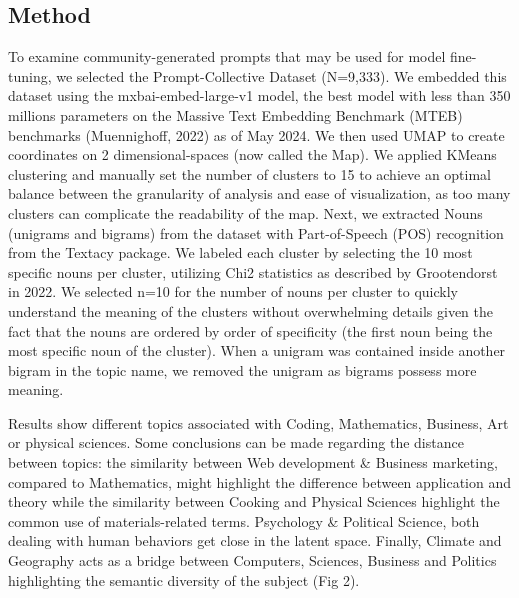 \documentclass{article}
\begin{document}
\subsection{Method}

To examine community-generated prompts that may be used for model fine-tuning, we selected the Prompt-Collective Dataset (N=9,333).  We embedded this dataset using the mxbai-embed-large-v1 model, the best model with less than 350 millions parameters on the  Massive Text Embedding Benchmark (MTEB) benchmarks (Muennighoff, 2022) as of May 2024. We then used UMAP to create coordinates on 2 dimensional-spaces (now called the Map). We applied KMeans clustering and manually set the number of clusters to 15 to achieve an optimal balance between the granularity of analysis and ease of visualization, as too many clusters can complicate the readability of the map. Next, we extracted Nouns (unigrams and bigrams) from the dataset with Part-of-Speech (POS) recognition from the Textacy package. We labeled each cluster by selecting the 10 most specific nouns per cluster, utilizing Chi2 statistics as described by Grootendorst in 2022. We selected n=10 for the number of nouns per cluster to quickly understand the meaning of the clusters without overwhelming details given the fact that the nouns are ordered by order of specificity (the first noun being the most specific noun of the cluster). When a unigram was contained inside another bigram in the topic name, we removed the unigram as bigrams possess more meaning.

Results show different topics associated with Coding, Mathematics, Business, Art or physical sciences. Some conclusions can be made regarding the distance between topics: the similarity between Web development \& Business marketing, compared to Mathematics, might highlight the difference between application and theory while the similarity between Cooking and Physical Sciences highlight the common use of materials-related terms. Psychology \& Political Science, both dealing with human behaviors get close in the latent space. Finally, Climate and Geography acts as a bridge between Computers, Sciences, Business and Politics highlighting the semantic diversity of the subject (Fig 2).
\end{document}
